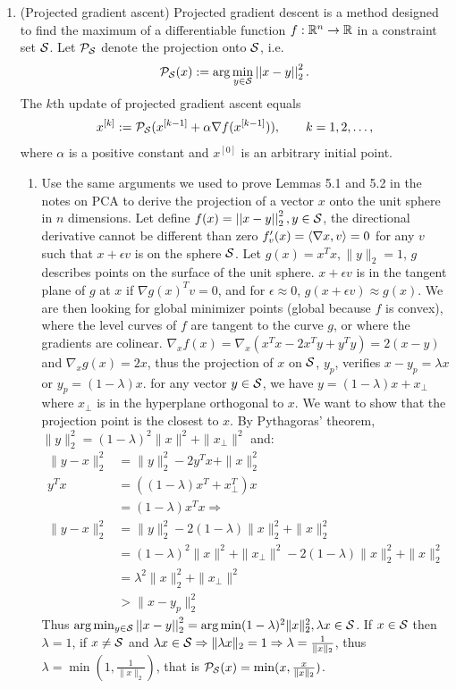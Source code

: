 \documentclass[12pt,twoside]{article}
\begin{document}
\begin{enumerate}
\newpage
\item (Projected gradient ascent) Projected gradient descent is a method designed to find the maximum of a differentiable function $f:\mathbb{R}^n \rightarrow \mathbb{R}$ in a constraint set $\mathcal{ S }$. Let $\mathcal{ P }_{\mathcal{ S }}$ denote the projection onto $\mathcal{ S }$, i.e.
\begin{align}
\mathcal{ P }_{\mathcal{ S }}(x) := \arg \min_{y \in \mathcal{ S }} \left|\left| x-y \right|\right| _{2}^2.
\end{align} 
The $k$th update of projected gradient ascent equals
\begin{align}
x^{[k]} :=\mathcal{ P }_{\mathcal{ S }}( x^{[k-1]} + \alpha \nabla f (x^{[k-1]}) ), \qquad k=1,2,\ldots,
\end{align}
where $\alpha$ is a positive constant and $x^{[0]}$ is an arbitrary initial point.
\begin{enumerate}
\item Use the same arguments we used to prove Lemmas 5.1 and 5.2 in the notes on PCA to derive the projection of a vector $x$ onto the unit sphere in $n$ dimensions.
Let define $f(x) =  \left|\left| x-y \right|\right| _{2}^2,y \in \mathcal{ S }$, the directional derivative cannot be different than zero $f'_v(x) = \left \langle \nabla{x}, v\right \rangle = 0$ for any $v$ such that $x+ \epsilon v$ is on the sphere $\mathcal{ S }$. Let $g(x)=x^T x, \| y \|_2 = 1$, $g$ describes points on the surface of the unit sphere. $x +\epsilon v$ is in the tangent  plane of $g$ at $x$ if $\nabla{g(x)}^T v = 0$, and for $\epsilon \approx 0$, $g(x + \epsilon v) \approx g(x)$. We are then looking for global minimizer points (global because $f$ is convex), where the level curves of $f$ are tangent to the curve $g$, or where the gradients are colinear. $\nabla_x{f(x)} = \nabla_x{(x^T x -2 x^T y + y^T y)} = 2 (x-y)$ and $\nabla_x{g(x)} = 2 x$, thus the projection of $x$ on $\mathcal{ S }$, $y_p$, verifies $x -y_p = \lambda x$ or $y_p = (1- \lambda) x$. for any vector $y \in \mathcal{ S }$, we have $y = (1-\lambda) x + x_\bot$ where $x_\bot$ is in the hyperplane orthogonal to $x$. We want to show that the projection point is the closest to $x$.
	By Pythagoras’ theorem, $\|y\|_2^2 = (1-\lambda)^2 \|x\|^2 + \|x_\bot\|^2$ and:
	\begin{align*}
		\|y - x \|_2^2	&=	\|y\|_2^2 -2 y^T x + \| x \|_2^2 \\
		y^Tx			&=	((1-\lambda) x^T + x_\bot^T) x \\
					&=	(1-\lambda) x^T x \Rightarrow \\
		\|y - x \|_2^2	&=	\|y\|_2^2 - 2 (1-\lambda) \|x\|_2^2 + \| x\|_2^2 \\
					&= 	(1-\lambda)^2 \|x\|^2 + \|x_\bot\|^2  - 2 (1-\lambda) \|x\|_2^2 + \| x\|_2^2 \\
					&=	\lambda^2 \| x \|_2^2 + \|x_\bot\|^2 \\	
					&> \| x - y_p \|_2^2
	\end{align*}
	Thus  $\arg \min_{y \in \mathcal{ S }} \left|\left| x-y \right|\right| _{2}^2 =\arg \min  (1-\lambda)^2 \|x\|_2^2, \lambda x  \in \mathcal{ S }$. If $x \in  \mathcal{ S }$ then $\lambda = 1$, 
	if $x \neq \mathcal{ S }$ and $\lambda x  \in \mathcal{ S } \Rightarrow \|\lambda x \|_2 = 1 \Rightarrow \lambda = \frac{1}{\|x\|_2}$, thus $\lambda = \min(1,  \frac{1}{\|x\|_2})$,
	that is $\mathcal{ P }_{\mathcal{ S }}(x) = \min(x, \frac{x}{\|x\|_2})$.



\end{enumerate}
\end{enumerate}
\end{document}
